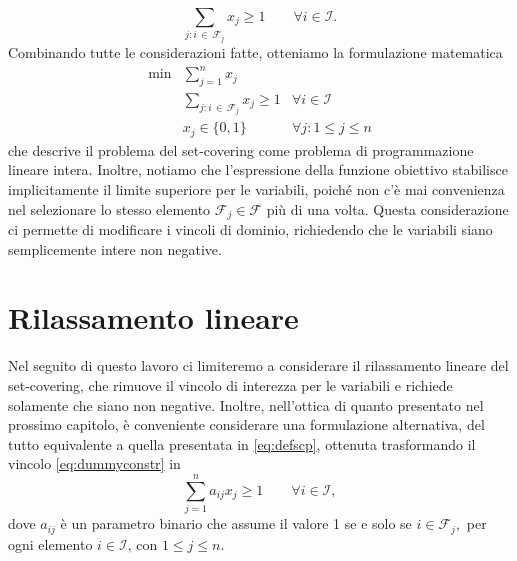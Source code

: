 \begin{equation}\label{eq:dummyconstr}
    \sum_{j\colon i \,\in\, \mathcal{F}_j} \!\!x_j \geq 1 \qquad \forall i \in \mathcal{I}.
\end{equation}
Combinando tutte le considerazioni fatte, otteniamo la formulazione matematica
\begin{equation}\label{eq:defscp}
    \begin{array}{lll}
        \min & \displaystyle\sum_{j = 1}^n x_j \\[20pt]
             & \!\!\!\displaystyle\sum_{j\colon i \,\in\, \mathcal{F}_j} \!\!x_j \geq 1 & \forall i \in \mathcal{I} \\[20pt]
             & x_j \in \{0, 1\} & \forall j\colon 1 \leq j \leq n
    \end{array}
\end{equation}
che descrive il problema del set-covering come problema di programmazione lineare intera. Inoltre, notiamo che
l'espressione della funzione obiettivo stabilisce implicitamente il limite superiore per le variabili, poiché non c'è
mai convenienza nel selezionare lo stesso elemento \( \mathcal{F}_j \in \mathcal{F}\) più di una volta. Questa
considerazione ci permette di modificare i vincoli di dominio, richiedendo che le variabili siano semplicemente intere
non negative.

\section{Rilassamento lineare}

Nel seguito di questo lavoro ci limiteremo a considerare il rilassamento lineare del set-covering, che rimuove il
vincolo di interezza per le variabili e richiede solamente che siano non negative. Inoltre, nell'ottica di quanto
presentato nel prossimo capitolo, è conveniente considerare una formulazione alternativa, del tutto equivalente a quella
presentata in \eqref{eq:defscp}, ottenuta trasformando il vincolo \eqref{eq:dummyconstr} in
\begin{equation}\label{eq:coverconss}
    \sum_{j=1}^n a_{ij}x_j \geq 1 \qquad \forall i \in \mathcal{I},
\end{equation}
dove \( a_{ij} \) è un parametro binario che assume il valore 1 se e solo se
\(
    i \in \mathcal{F}_j,
\)
per ogni elemento
\(
    i \in \mathcal{I} \text{, con } 1\leq j \leq n.
\)

